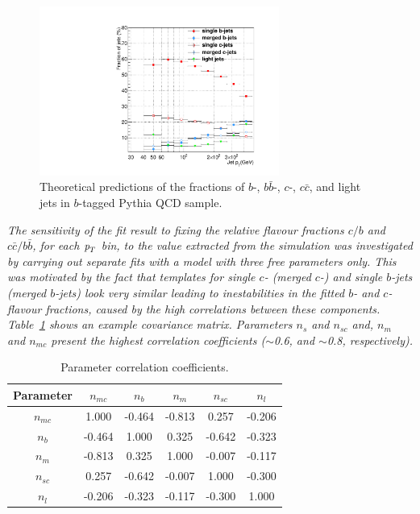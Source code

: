 \begin{figure}[tp]
\centering
\includegraphics[width=0.70\textwidth]{TrueFractions_NominalPythia.pdf}
\caption{Theoretical predictions of the fractions of $b$-, $b\bar{b}$-, $c$-, $c\bar{c}$, and light jets in $b$-tagged {\sc Pythia} QCD sample.}
\label{fig:truefractions}
\end{figure}


\emph{The sensitivity of the fit result to fixing the relative flavour fractions  $c/b$ and $c\bar{c}/b\bar{b}$, for each ${\emph{p}_{T}}$ bin, to the value extracted from the simulation was investigated by carrying out separate fits with a model with three free parameters only. This was motivated by the fact that templates for single $c$- (merged $c$-)  and single $b$-jets (merged $b$-jets) look very similar leading to inestabilities in the fitted $b$- and $c$-flavour fractions, caused by the high correlations between these components.  Table~\ref{tb:correlations} shows an example covariance matrix.  Parameters $n_s$ and $n_{sc}$ and, $n_m$ and $n_{mc}$ present the highest correlation coefficients ($\sim$0.6, and $\sim$0.8, respectively).}


\begin{table}[!hbt] %
\renewcommand{\arraystretch}{1.2}
\centering
\begin{tabular}{ | c | c | c | c | c | c |}
\hline
  Parameter & $n_{mc}$  & $n_b$  & $n_m$  & $n_{sc}$  &  $n_l$ \\ \hline
  $n_{mc}$   & 1.000 &-0.464 &-0.813&  0.257 &-0.206 \\ \hline
  $n_b$     & -0.464 & 1.000 & 0.325& -0.642 &-0.323 \\ \hline
  $n_m$     &-0.813 & 0.325 & 1.000& -0.007& -0.117 \\ \hline
  $n_{sc}$   &0.257 &-0.642 &-0.007 & 1.000 &-0.300 \\ \hline
  $n_l$      & -0.206& -0.323 &-0.117 &-0.300 & 1.000 \\ \hline
\end{tabular}
\caption{Parameter correlation coefficients.}
\label{tb:correlations}
\end{table}

